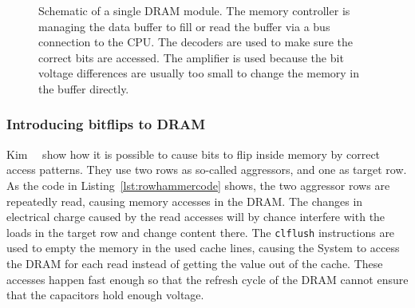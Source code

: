 \begin{figure}
  \centering
  \caption{Schematic of a single DRAM module. The memory controller is managing
the data buffer to fill or read the buffer via a bus connection to the CPU. The
decoders are used to make sure the correct bits are accessed. The amplifier is
used because the bit voltage differences are usually too small to change the
memory in the buffer directly.}
  \label{fig:DRAMscheme}
\end{figure}

\subsubsection{Introducing bitflips to DRAM}

Kim~\etal~\cite{rowhammergeneral} show how it is possible to cause bits to flip
inside memory by correct access patterns. They use two rows as so-called
aggressors, and one as target row. As the code in
Listing~\ref{lst:rowhammercode} shows, the two aggressor rows are repeatedly
read, causing memory accesses in the DRAM. The changes in electrical charge
caused by the read accesses will by chance interfere with the loads in the
target row and change content there. The \texttt{clflush} instructions are used
to empty the memory in the used cache lines, causing the System to access the
DRAM for each read instead of getting the value out of the cache. These accesses
happen fast enough so that the refresh cycle of the DRAM cannot ensure that the
capacitors hold enough voltage.

